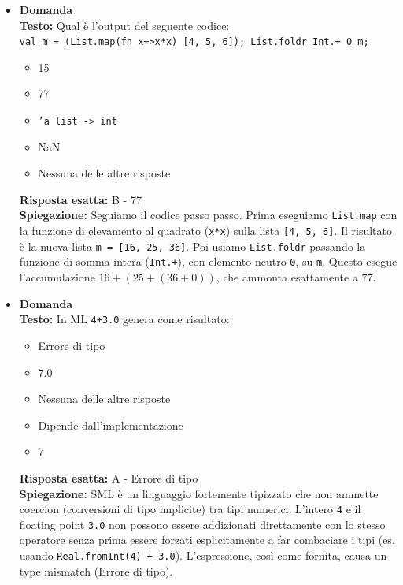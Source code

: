 \documentclass[12pt, a4paper]{article}
\newcounter{domandateoria}
\begin{document}
\begin{itemize}
\newpage

    \item {}\textbf{Domanda \thedomandateoria} \\
    \textbf{Testo:} Qual è l'output del seguente codice: \\
    \texttt{val m = (List.map(fn x=>x*x) [4, 5, 6]); List.foldr Int.+ 0 m;}
    \begin{itemize}
        \item[A)] 15
        \item[B)] 77
        \item[C)] \texttt{'a list -> int}
        \item[D)] NaN
        \item[E)] Nessuna delle altre risposte
    \end{itemize}
    \textbf{Risposta esatta:} B - 77 \\
    \textbf{Spiegazione:} Seguiamo il codice passo passo. Prima eseguiamo \texttt{List.map} con la funzione di elevamento al quadrato (\texttt{x*x}) sulla lista \texttt{[4, 5, 6]}. Il risultato è la nuova lista \texttt{m = [16, 25, 36]}. Poi usiamo \texttt{List.foldr} passando la funzione di somma intera (\texttt{Int.+}), con elemento neutro \texttt{0}, su \texttt{m}. Questo esegue l'accumulazione $16 + (25 + (36 + 0))$, che ammonta esattamente a $77$.
    \vspace{0.3cm}

    \item {}\textbf{Domanda \thedomandateoria} \\
    \textbf{Testo:} In ML \texttt{4+3.0} genera come risultato:
    \begin{itemize}
        \item[A)] Errore di tipo
        \item[B)] 7.0
        \item[C)] Nessuna delle altre risposte
        \item[D)] Dipende dall'implementazione
        \item[E)] 7
    \end{itemize}
    \textbf{Risposta esatta:} A - Errore di tipo \\
    \textbf{Spiegazione:} SML è un linguaggio fortemente tipizzato che non ammette coercion (conversioni di tipo implicite) tra tipi numerici. L'intero \texttt{4} e il floating point \texttt{3.0} non possono essere addizionati direttamente con lo stesso operatore senza prima essere forzati esplicitamente a far combaciare i tipi (es. usando \texttt{Real.fromInt(4) + 3.0}). L'espressione, così come fornita, causa un type mismatch (Errore di tipo).
    \vspace{0.3cm}


\end{itemize}
\end{document}
